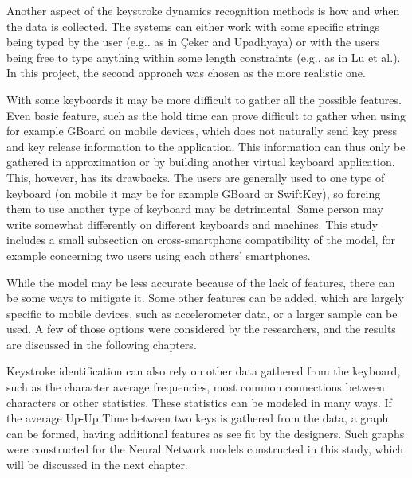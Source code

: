 Another aspect of the keystroke dynamics recognition methods is how and when the data is collected. The systems can either work with some specific strings being typed by the user (e.g.. as in Çeker and Upadhyaya) or with the users being free to type anything within some length constraints (e.g., as in Lu et al.). In this project, the second approach was chosen as the more realistic one.

With some keyboards it may be more difficult to gather all the possible features. Even basic feature, such as the hold time can prove difficult to gather when using for example GBoard on mobile devices, which does not naturally send key press and key release information to the application. \cite{android_keyboard_commands_2025} This information can thus only be gathered in approximation or by building another virtual keyboard application. This, however, has its drawbacks. The users are generally used to one type of keyboard (on mobile it may be for example GBoard or SwiftKey), so forcing them to use another type of keyboard may be detrimental. Same person may write somewhat differently on different keyboards and machines. This study includes a small subsection on cross-smartphone compatibility of the model, for example concerning two users using each others' smartphones.

While the model may be less accurate because of the lack of features, there can be some ways to mitigate it. Some other features can be added, which are largely specific to mobile devices, such as accelerometer data, or a larger sample can be used. A few of those options were considered by the researchers, and the results are discussed in the following chapters.

Keystroke identification can also rely on other data gathered from the keyboard, such as the character average frequencies, most common connections between characters or other statistics. \cite{Wang2024} These statistics can be modeled in many ways. If the average Up-Up Time between two keys is gathered from the data, a graph can be formed, having additional features as see fit by the designers. Such graphs were constructed for the Neural Network models constructed in this study, which will be discussed in the next chapter.